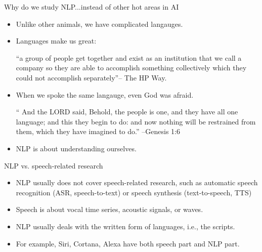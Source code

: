 \documentclass[11pt,handout]{beamer}
\begin{document}
\begin{frame}{Why do we study NLP...instead of other hot areas in AI}
 \begin{itemize}
  \item Unlike other animals, we have complicated langauges. \pause
  \item Languages make us great\pause: 
  \small{
    \begin{exampleblock}{}
   ``a group of people get together and exist as an institution that we call a company so they are able to accomplish something collectively which they could not accomplish separately''\pause -- The HP Way.  
    \end{exampleblock}
    }
  
  \item When we spoke the same langauge, even God was afraid. 
  
  \begin{exampleblock}{}
   `` And the LORD said, Behold, the people is one, and they have all one language; and this they begin to do: and now nothing will be restrained from them, which they have imagined to do.''  --Genesis 1:6
  \end{exampleblock}
  
  \item NLP is about understanding ourselves. 
 \end{itemize}
\end{frame}

\begin{frame}{NLP vs. speech-related research}
  \begin{itemize}
    \item NLP usually does not cover speech-related research, such as automatic speech recognition (ASR, speech-to-text) or speech synthesis (text-to-speech, TTS)
    \item Speech is about vocal time series, acoustic signals, or waves.
    \item NLP usually deals with the written form of languages, i.e., the scripts. 
    \item For example, Siri, Cortana, Alexa have both speech part and NLP part. 
  \end{itemize}
\end{frame}
\end{document}
